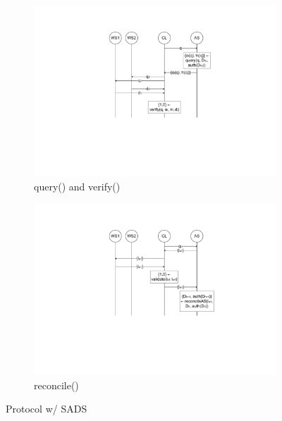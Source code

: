 \begin{figure}
        ~ %
	\newline

        \begin{subfigure}[t]{0.49\textwidth}
                \centering
                \includegraphics[width=\textwidth]{figure/sads_3.pdf}
                \caption{query() and verify()}
                \label{fig:sads_3}
        \end{subfigure}
        \begin{subfigure}[t]{0.49\textwidth}
                \centering
                \includegraphics[width=\textwidth]{figure/sads_4.pdf}
                \caption{reconcile()}
                \label{fig:sads_4}
        \end{subfigure}
        \caption{Protocol w/ SADS}
	\label{fig:sads}
\end{figure}

